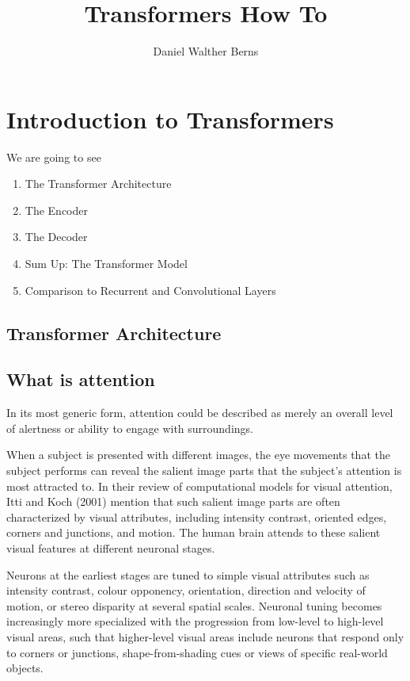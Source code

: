\documentclass[10pt,a4paper]{article}
\author{Daniel Walther Berns}
\title{Transformers How To}
\begin{document}
\maketitle

\section{Introduction to Transformers}

We are going to see
\begin{enumerate}
\item The Transformer Architecture
\item The Encoder
\item The Decoder
\item Sum Up: The Transformer Model
\item Comparison to Recurrent and Convolutional Layers
\end{enumerate}

\subsection{Transformer  Architecture}

\subsection{What is attention}

In its most generic form, attention could be described as merely an overall level of alertness or ability to engage with surroundings.

When a subject is presented with different images, the eye movements that the subject performs can reveal the salient image parts that the subject’s attention is most attracted to. In their review of computational models for visual attention, Itti and Koch (2001) mention that such salient image parts are often characterized by visual attributes, including intensity contrast, oriented edges, corners and junctions, and motion. The human brain attends to these salient visual features at different neuronal stages. 

Neurons at the earliest stages are tuned to simple visual attributes such as intensity contrast, colour opponency, orientation, direction and velocity of motion, or stereo disparity at several spatial scales. Neuronal tuning becomes increasingly more specialized with the progression from low-level to high-level visual areas, such that higher-level visual areas include neurons that respond only to corners or junctions, shape-from-shading cues or views of specific real-world objects.
\end{document}
